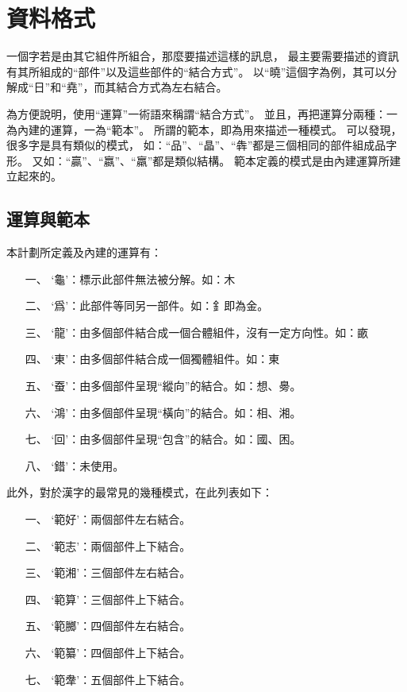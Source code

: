 \chapter{資料格式}

一個字若是由其它組件所組合，那麼要描述這樣的訊息，
最主要需要描述的資訊有其所組成的``部件''以及這些部件的``結合方式''。
以``曉''這個字為例，其可以分解成``日''和``堯''，而其結合方式為左右結合。

為方便說明，使用``運算''一術語來稱謂``結合方式''。
並且，再把運算分兩種：一為內建的運算，一為``範本''。
所謂的範本，即為用來描述一種模式。
可以發現，很多字是具有類似的模式，
如：``品''、``晶''、``犇''都是三個相同的部件組成品字形。
又如：``贏''、``嬴''、``羸''都是類似結構。
範本定義的模式是由內建運算所建立起來的。

\section{運算與範本}
本計劃所定義及內建的運算有：
\begin{enumerate}
\item[一、]`龜'：標示此部件無法被分解。如：木
\item[二、]`爲'：此部件等同另一部件。如：釒即為金。
\item[三、]`龍'：由多個部件結合成一個合體組件，沒有一定方向性。如：畞
\item[四、]`東'：由多個部件結合成一個獨體組件。如：東
\item[五、]`蚕'：由多個部件呈現``縱向''的結合。如：想、臱。
\item[六、]`鴻'：由多個部件呈現``橫向''的結合。如：相、湘。
\item[七、]`回'：由多個部件呈現``包含''的結合。如：國、困。
\item[八、]`錯'：未使用。
\end{enumerate}

此外，對於漢字的最常見的幾種模式，在此列表如下：
\begin{enumerate}
\item[一、]`範好'：兩個部件左右結合。
\item[二、]`範志'：兩個部件上下結合。
\item[三、]`範湘'：三個部件左右結合。
\item[四、]`範算'：三個部件上下結合。
\item[五、]`範膷'：四個部件左右結合。
\item[六、]`範纂'：四個部件上下結合。
\item[七、]`範舝'：五個部件上下結合。
\end{enumerate}

